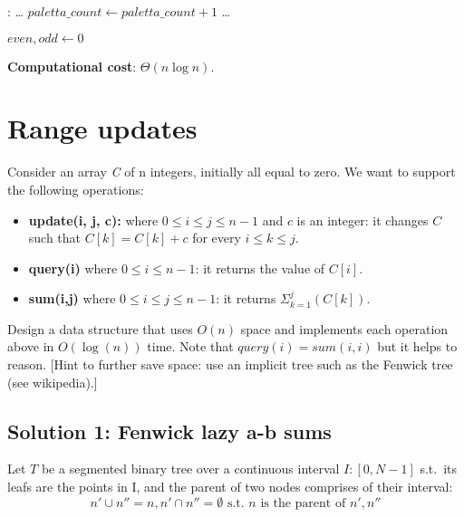 \documentclass{article}
\begin{document}
\begin{algorithmic}[1]
  :
    \State \dots                        {}
      \State $paletta\_count \gets paletta\_count + 1$
      \State \dots
      \EndIf
    \EndFunction
\end{algorithmic}

\begin{algorithmic}[1]
    \State $even, odd \gets 0$
        \State {}\;
      \EndIf
    \EndFor
    \State {}\;
    \EndFunction
\end{algorithmic}

\begin{framed}
  \noindent
  \textbf{Computational cost}: $\Theta(n\log n)$.
\end{framed}


\newpage
\section{Range updates}

Consider an array \emph{C} of n integers, initially all equal to zero.
We want to support the following operations:
\begin{itemize}
    \item \textbf{update(i, j, c):} where $0 \leq i \leq j \leq n - 1$ and $c$ is
    an integer: it changes $C$ such that $C[k] = C[k] + c$ for every $i \leq k \leq j$.
    \item \textbf{query(i)} where $0 \leq i \leq n - 1$: it returns the value of $C[i]$.
    \item \textbf{sum(i,j)} where $0 \leq i \leq j \leq n - 1$: it returns
                    $\Sigma_{k = 1}^{j}(C[k])$.
\end{itemize}

Design a data structure that uses $O(n)$ space and implements each operation above
in $O(\log(n))$ time. Note that $query(i) = sum(i, i)$ but it helps to reason.
[Hint to further save space: use an implicit tree such as the Fenwick tree (see wikipedia).]

\subsection{Solution 1: Fenwick lazy a-b sums}
Let $T$ be a segmented binary tree over a continuous interval $I: [0, N - 1]$
s.t.\ its leafs are the points in I, and the parent of two nodes comprises of their interval:
$$  n' \cup n'' = n, n' \cap n'' = \emptyset   \textrm{ s.t. } n \text{ is the parent of } n', n''$$
\end{document}
